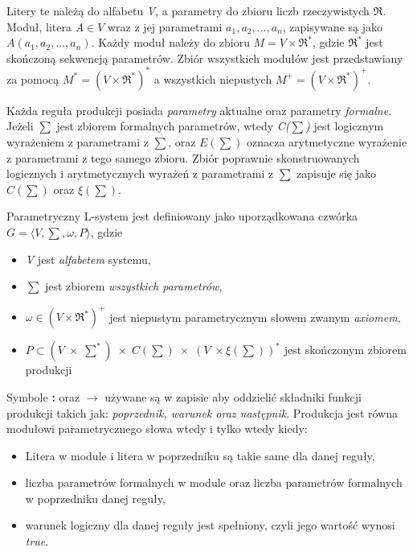 \documentclass[12pt]{report}
\begin{document}
\begin{sloppypar}
\par Litery te należą do alfabetu \textit{V}, a parametry do zbioru liczb rzeczywistych $\Re$. Moduł, litera \textit{A$\in V$} wraz z jej parametrami \textit{$a_{1},a_{2},...,a_{n}$}, zapisywane są jako \textit{$A(a_{1},a_{2},...,a_{n})$}. Każdy moduł należy do zbioru \textit{$M=V \times \Re^{*}$}, gdzie $\Re^{*}$ jest skończoną sekwencją parametrów. Zbiór wszystkich modułów jest przedstawiany za pomocą \textit{$M^{*}=(V \times \Re^{*})^{*}$} a wszystkich niepustych \textit{$M^{+}=(V \times \Re^{*})^{+}$}.
\par Każda reguła produkcji posiada \textit{parametry} aktualne oraz parametry \textit{formalne}. Jeżeli \textit{$\sum$} jest zbiorem formalnych parametrów, wtedy \textit{C($\sum$)} jest logicznym wyrażeniem z parametrami z \textit{$\sum$}, oraz \textit{$E(\sum)$} oznacza arytmetyczne wyrażenie z parametrami z tego samego zbioru. Zbiór poprawnie skonstruowanych logicznych i arytmetycznych wyrażeń z parametrami z \textit{$\sum$} zapisuje się jako \textit{$C(\sum)$} oraz \textit{$\xi(\sum)$}.
\newpage
\par Parametryczny L-system jest definiowany jako uporządkowana czwórka \textit{$G=\langle V,\sum,\omega,P \rangle$}, gdzie
\begin{itemize}
\item \textit{V} jest \textit{alfabetem} systemu,
\item   \textit{$\sum$} jest zbiorem \textit{wszystkich parametrów},
\item   \textit{$\omega \in (V \times \Re^{*})^{+}$} jest niepustym parametrycznym słowem zwanym \textit{axiomem},
\item  \textit{$P\subset(V\;\times\;\sum^{*})\;\times\;C(\sum) \;\times\; (V\; \times \xi(\sum))^{*}  $} jest skończonym zbiorem produkcji
  \end{itemize}
\par Symbole \textbf{:} oraz \textit{$\rightarrow$} używane są w zapisie aby oddzielić składniki funkcji produkcji takich jak: \textit{poprzednik, warunek oraz następnik}. 
Produkcja jest równa modułowi parametrycznego słowa wtedy i tylko wtedy kiedy:
\begin{itemize}
\item Litera w module i litera w poprzedniku są takie same dla danej reguły,
\item liczba parametrów formalnych w module oraz liczba parametrów formalnych w poprzedniku danej reguły,
\item warunek logiczny dla danej reguły jest spełniony, czyli jego wartość wynosi \textit{true}.
\end{itemize}


\end{sloppypar}
\end{document}
